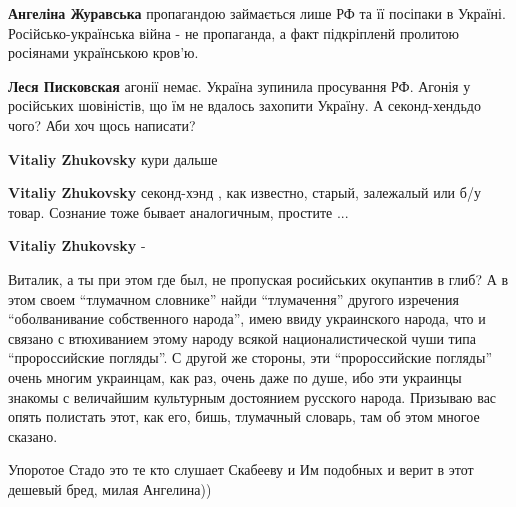\begin{itemize}
\begin{itemize}
\textbf{Ангеліна Журавська} пропагандою займається лише РФ та її посіпаки в Україні. Російсько-українська війна - не пропаганда, а факт підкріпленй пролитою росіянами українською кров'ю.

\textbf{Леся Писковская} агонії немає. Україна зупинила просування РФ. Агонія у російських шовіністів, що їм не вдалось захопити Україну. А секонд-хендьдо чого? Аби хоч щось написати?

\textbf{Vitaliy Zhukovsky} кури дальше

\textbf{Vitaliy Zhukovsky} секонд-хэнд , как известно, старый, залежалый или б/у товар. Сознание тоже бывает аналогичным, простите ...


\textbf{Vitaliy Zhukovsky} -

Виталик, а ты при этом где был, не пропуская росийських окупантив в глиб? А в этом
своем \enquote{тлумачном словнике} найди \enquote{тлумачення} другого изречения \enquote{оболванивание
собственного народа}, имею ввиду украинского народа, что и связано с втюхиванием
этому народу всякой националистической чуши типа \enquote{пророссийские погляды}. С
другой же стороны, эти \enquote{пророссийские погляды} очень многим украинцам, как
раз, очень даже по душе, ибо эти украинцы знакомы с величайшим культурным
достоянием русского народа. Призываю вас опять полистать этот, как
его, бишь, тлумачный словарь, там об этом многое сказано.

\end{itemize} %


Упоротое Стадо это те кто слушает Скабееву и Им подобных и верит в этот дешевый
бред, милая Ангелина))

\end{itemize} %

